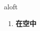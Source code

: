 
\begin{frame}
{\huge aloft}
\begin{center}
\begin{enumerate}\Large
  \item \textbf{在空中}
\end{enumerate}
\end{center}
\end{frame}
